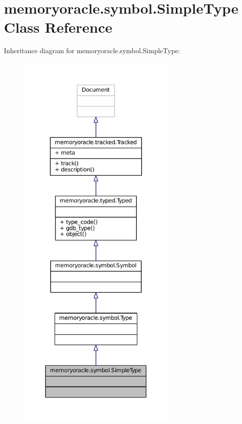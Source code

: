 \hypertarget{classmemoryoracle_1_1symbol_1_1SimpleType}{}\section{memoryoracle.\+symbol.\+Simple\+Type Class Reference}
\label{classmemoryoracle_1_1symbol_1_1SimpleType}


Inheritance diagram for memoryoracle.\+symbol.\+Simple\+Type\+:
\nopagebreak
\begin{figure}[H]
\begin{center}
\leavevmode
\includegraphics[height=550pt]{classmemoryoracle_1_1symbol_1_1SimpleType__inherit__graph}
\end{center}
\end{figure}


